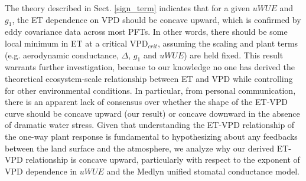 The theory described in Sect. \ref{sign_term} indicates that for a
given $uWUE$ and $g_1$, the ET dependence on VPD should be concave
upward, which is confirmed by eddy covariance data across most PFTs. In other words, there should be some local minimum in ET at a
critical VPD$_{crit}$, assuming the scaling and plant terms  (e.g. aerodynamic
conductance, $\Delta$, $g_1$ and $uWUE$) are held fixed. This result warrants further
investigation, because to our knowledge no one has derived the
theoretical ecosystem-scale relationship between ET and VPD while
controlling for other environmental conditions. In particular, from
personal communication, there is an apparent lack of consensus over
whether the shape of the ET-VPD curve should be concave upward (our
result) or concave downward in the absence of dramatic water stress. Given that understanding the ET-VPD
relationship of the one-way plant response is fundamental to
hypothesizing about any feedbacks between the land surface and the
atmosphere, we analyze why our derived ET-VPD relationship is concave
upward, particularly with respect to the exponent of VPD dependence in
$uWUE$ and the Medlyn unified stomatal conductance model.

